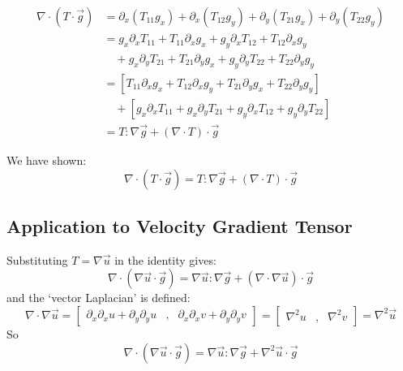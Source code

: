 \documentclass[12pt, a4paper, twoside, openright]{book}
\begin{document}
\begin{align}
\nabla \cdot (T \cdot \vec{g}) & = 
\partial_x (T_{11} g_x) + \partial_x (T_{12} g_y) +
\partial_y (T_{21} g_x) + \partial_y (T_{22} g_y) \\
 & = g_x \partial_x T_{11} + T_{11} \partial_x g_x +
     g_y \partial_x T_{12} + T_{12} \partial_x g_y \\
 & \quad +    g_x \partial_y T_{21} + T_{21} \partial_y g_x +
     g_y \partial_y T_{22} + T_{22} \partial_y g_y \\
 & =\left[ T_{11} \partial_x g_x  +  T_{12} \partial_x g_y +
           T_{21} \partial_y g_x  +  T_{22} \partial_y g_y \right] \\
 & \quad + \left[ g_x \partial_x T_{11}  +  g_x \partial_y T_{21} +
           g_y \partial_x T_{12}  +  g_y \partial_y T_{22} \right] \\
 & = T:\nabla \vec{g} + (\nabla \cdot T) \cdot \vec{g}
\end{align}


We have shown:
\begin{equation}
\nabla \cdot (T \cdot \vec{g}) =  T:\nabla \vec{g} + (\nabla \cdot T) \cdot \vec{g}
\end{equation}

\clearpage
\subsection{Application to Velocity Gradient Tensor}

Substituting $T = \nabla \vec{u}$ in the identity gives:
\begin{equation}
\nabla \cdot (\nabla \vec{u} \cdot \vec{g}) = 
\nabla \vec{u}:\nabla \vec{g} + (\nabla \cdot \nabla \vec{u}) \cdot \vec{g}
\end{equation}
and the `vector Laplacian' is defined:
\begin{equation}
\nabla \cdot \nabla \vec{u} =
\begin{bmatrix}
\partial_x \partial_x u + \partial_y \partial_y u &,& \partial_x \partial_x v + \partial_y \partial_y v
\end{bmatrix} =
\begin{bmatrix}
\nabla^2 u &,& \nabla^2 v
\end{bmatrix}
= \nabla^2 \vec{u}
\end{equation}
So
\begin{equation}
\nabla \cdot (\nabla \vec{u} \cdot \vec{g}) = 
\nabla \vec{u}:\nabla \vec{g} + \nabla^2 \vec{u} \cdot \vec{g}
\end{equation}
\end{document}
